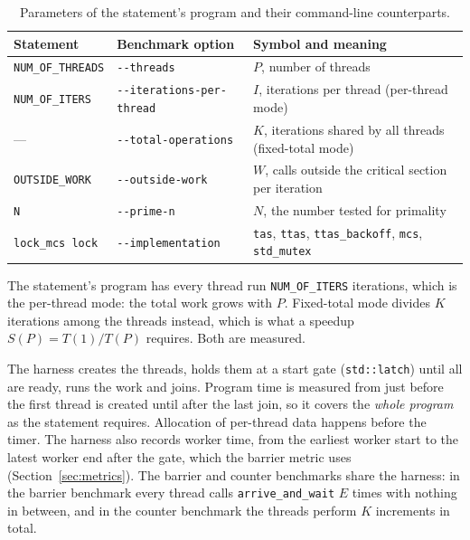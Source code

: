 \begin{table}[H]
\centering
\small
\caption{Parameters of the statement's program and their command-line counterparts.}\label{tab:macro-map}
\begin{tabular}{|>{\raggedright\arraybackslash}p{}|>{\raggedright\arraybackslash}p{}|>{\raggedright\arraybackslash}p{}|}
\hline
\textbf{Statement\cite{r1}} & \textbf{Benchmark option} & \textbf{Symbol and meaning} \\ \hline
\texttt{NUM\_OF\_THREADS} & \texttt{-{}-threads} & $P$, number of threads \\ \hline
\texttt{NUM\_OF\_ITERS} & \texttt{-{}-iterations-per-thread} & $I$, iterations per thread (per-thread mode) \\ \hline
--- & \texttt{-{}-total-operations} & $K$, iterations shared by all threads (fixed-total mode) \\ \hline
\texttt{OUTSIDE\_WORK} & \texttt{-{}-outside-work} & $W$, calls outside the critical section per iteration \\ \hline
\texttt{N} & \texttt{-{}-prime-n} & $N$, the number tested for primality \\ \hline
\texttt{lock\_mcs lock} & \texttt{-{}-implementation} & \texttt{tas}, \texttt{ttas}, \texttt{ttas\_backoff}, \texttt{mcs}, \texttt{std\_mutex} \\ \hline
\end{tabular}
\end{table}

The statement's program has every thread run \texttt{NUM\_OF\_ITERS} iterations, which is the per-thread mode: the total work grows with $P$. Fixed-total mode divides $K$ iterations among the threads instead, which is what a speedup $S(P)=T(1)/T(P)$ requires. Both are measured.

The harness creates the threads, holds them at a start gate (\texttt{std::latch}) until all are ready, runs the work and joins. Program time is measured from just before the first thread is created until after the last join, so it covers the \emph{whole program} as the statement requires. Allocation of per-thread data happens before the timer. The harness also records worker time, from the earliest worker start to the latest worker end after the gate, which the barrier metric uses (Section~\ref{sec:metrics}). The barrier and counter benchmarks share the harness: in the barrier benchmark every thread calls \texttt{arrive\_and\_wait} $E$ times with nothing in between, and in the counter benchmark the threads perform $K$ increments in total.
